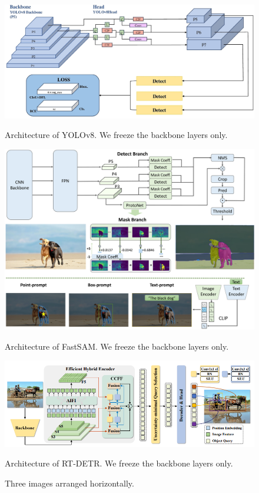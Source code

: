 \documentclass{article}
\begin{document}
\begin{figure}[htbp]
  \centering
  \begin{minipage}{0.5\textwidth}
    \centering
    \includegraphics[width=\linewidth]{images/yolo-arch.jpg}
    \caption{Architecture of YOLOv8. We freeze the backbone layers only.}
    \label{fig:yolo-arch}
  \end{minipage}%
  \hfill
  \begin{minipage}{0.5\textwidth}
    \centering
    \includegraphics[width=\linewidth]{images/fastsam-arch.png}
    \caption{Architecture of FastSAM. We freeze the backbone layers only.}
    \label{fig:fastsam-arch}
  \end{minipage}%

  \begin{minipage}{0.8\textwidth}
    \centering
    \includegraphics[width=\linewidth]{images/rtdetr-arch.png}
    \caption{Architecture of RT-DETR. We freeze the backbone layers only.}
    \label{fig:rt-detr-arch}
  \end{minipage}
  \caption{Three images arranged horizontally.}
  \label{fig:three_horizontal_images}
\end{figure}
\end{document}
